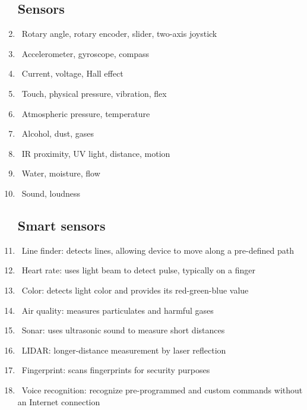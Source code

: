 \documentclass[12pt]{article}
\begin{document}
\begin{enumerate}
\subsection {Sensors}
\item\ Rotary angle, rotary encoder, slider, two-axis joystick
\item\ Accelerometer, gyroscope, compass
\item\ Current, voltage, Hall effect
\item\ Touch, physical pressure, vibration, flex
\item\ Atmospheric pressure, temperature
\item\ Alcohol, dust, gases
\item\ IR proximity, UV light, distance, motion
\item\ Water, moisture, flow
\item\ Sound, loudness

\subsection {Smart sensors}
\item\ Line finder: detects lines, allowing device to move along a pre-defined path
\item\ Heart rate: uses light beam to detect pulse, typically on a finger
\item\ Color: detects light color and provides its red-green-blue value
\item\ Air quality: measures particulates and harmful gases
\item\ Sonar: uses ultrasonic sound to measure short distances
\item\ LIDAR: longer-distance measurement by laser reflection
\item\ Fingerprint: scans fingerprints for security purposes
\item\ Voice recognition: recognize pre-programmed and custom commands without an Internet connection
\end{enumerate}
\end{document}
